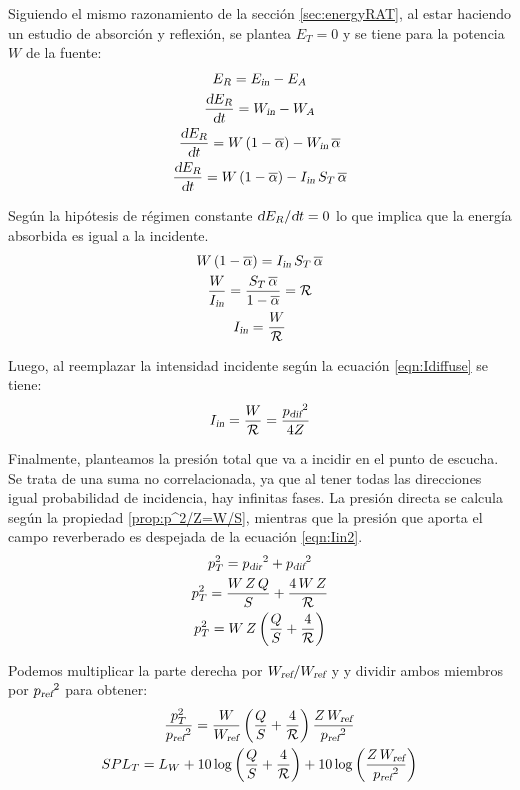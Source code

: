 \documentclass[a5paper,12pt,twoside]{book}
\begin{document}
Siguiendo el mismo razonamiento de la sección \ref{sec:energyRAT}, al estar haciendo un estudio de absorción y reflexión, se plantea $E_T=0$ y se tiene para la potencia $W$ de la fuente:
\begin{gather*}
    E_R = {{E}_\textsl{{in}}} - E_A
    \\
    \frac{\textsl{d} E_R}{\textsl{d} t} = {{W}_\textsl{{in}}} - W_A
    \\
    \frac{\textsl{d} E_R}{\textsl{d} t} = W \left(1-\overline{\alpha}\right) - {{W}_\textsl{{in}}} \, \overline{\alpha}
    \\
    \frac{\textsl{d} E_R}{\textsl{d} t} = W \left(1-\overline{\alpha}\right) - {{I}_\textsl{{in}}} \, S_T \, \overline{\alpha}
\end{gather*}

Según la hipótesis de régimen constante $\textsl{d} E_R/\textsl{d} t=0$ lo que implica que la energía absorbida es igual a la incidente.
\begin{gather*}
    W \left(1-\overline{\alpha}\right) = {{I}_\textsl{{in}}} \, S_T \, \overline{\alpha}
    \\
    \frac{W}{{{I}_\textsl{{in}}}} = \frac{S_T \, \overline{\alpha}}{1-\overline{\alpha}} = \mathcal{R}
    \\
    {{I}_\textsl{{in}}} = \frac{W}{\mathcal{R}}
\end{gather*}

Luego, al reemplazar la intensidad incidente según la ecuación \ref{eqn:Idiffuse} se tiene:
\begin{equation}
    {{I}_\textsl{{in}}} = \frac{W}{\mathcal{R}} = \frac{{{p}_\textsl{{dif}}}^2}{4 Z}
    \label{eqn:Iin2}
\end{equation}

Finalmente, planteamos la presión total que va a incidir en el punto de escucha. Se trata de una suma no correlacionada, ya que al tener todas las direcciones igual probabilidad de incidencia, hay infinitas fases. La presión directa se calcula según la propiedad \ref{prop:p^2/Z=W/S}, mientras que la presión que aporta el campo reverberado es despejada de la ecuación \ref{eqn:Iin2}.
\begin{gather}
    p_T^2 = {{p}_\textsl{{dir}}}^2 + {{p}_\textsl{{dif}}}^2
    \notag
    \\
    p_T^2 = \frac{W \, Z \, Q}{S} + \frac{4 \, W \, Z}{\mathcal{R}}
    \notag
    \\
    p_T^2 = W\,Z \left( \frac{Q}{S} + \frac{4}{\mathcal{R}}\right)
    \label{eqn:criticalDist}
\end{gather}

Podemos multiplicar la parte derecha por ${{W}_\textsl{{ref}}}/{{W}_\textsl{{ref}}}$ y y dividir ambos miembros por ${{p}_\textsl{{ref}}}^2$ para obtener:
\begin{gather*}
    \frac{p_T^2}{{{p}_\textsl{{ref}}}^2} = \frac{W}{{{W}_\textsl{{ref}}}} \left( \frac{Q}{S} + \frac{4}{\mathcal{R}}\right) \frac{Z \, {{W}_\textsl{{ref}}}}{{{p}_\textsl{{ref}}}^2}
    \\
    SPL_T = L_W + 10 \log \left( \frac{Q}{S} + \frac{4}{\mathcal{R}} \right) + 10 \log \left( \frac{Z \, {{W}_\textsl{{ref}}}}{{{p}_\textsl{{ref}}}^2} \right)
\end{gather*}
\end{document}
